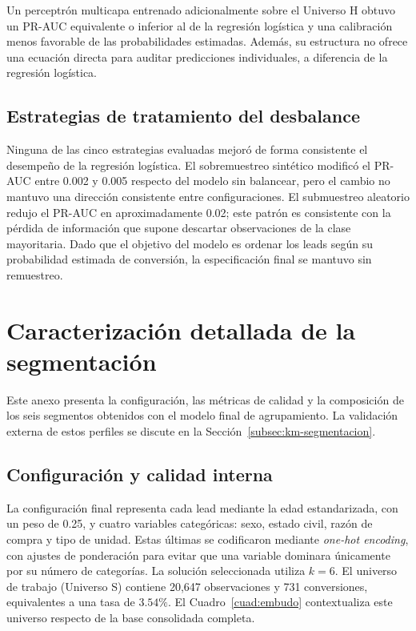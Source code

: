 
Un perceptrón multicapa entrenado adicionalmente sobre el Universo H obtuvo un
PR-AUC equivalente o inferior al de la regresión logística y una calibración menos
favorable de las probabilidades estimadas. Además, su estructura no ofrece una
ecuación directa para auditar predicciones individuales, a diferencia de la
regresión logística.

\section{Estrategias de tratamiento del desbalance}

Ninguna de las cinco estrategias evaluadas mejoró de forma consistente el desempeño
de la regresión logística. El sobremuestreo sintético modificó el PR-AUC entre 0.002
y 0.005 respecto del modelo sin balancear, pero el cambio no mantuvo una dirección
consistente entre configuraciones. El submuestreo aleatorio redujo el PR-AUC en
aproximadamente 0.02; este patrón es consistente con la pérdida de información que
supone descartar observaciones de la clase mayoritaria. Dado que el objetivo del
modelo es ordenar los leads según su probabilidad estimada de conversión, la
especificación final se mantuvo sin remuestreo.

\chapter{Caracterización detallada de la segmentación}
\label{anx:km-detalle}

Este anexo presenta la configuración, las métricas de calidad y la composición de los
seis segmentos obtenidos con el modelo final de agrupamiento. La validación externa
de estos perfiles se discute en la Sección~\ref{subsec:km-segmentacion}.

\section{Configuración y calidad interna}

La configuración final representa cada lead mediante la edad estandarizada, con un
peso de 0.25, y cuatro variables categóricas: sexo, estado civil, razón de compra y
tipo de unidad. Estas últimas se codificaron mediante \emph{one-hot encoding}, con
ajustes de ponderación para evitar que una variable dominara únicamente por su número
de categorías. La solución seleccionada utiliza $k=6$. El universo de trabajo
(Universo S) contiene 20{,}647 observaciones y 731 conversiones, equivalentes a una
tasa de $3.54\%$. El Cuadro~\ref{cuad:embudo} contextualiza este universo respecto de
la base consolidada completa.

